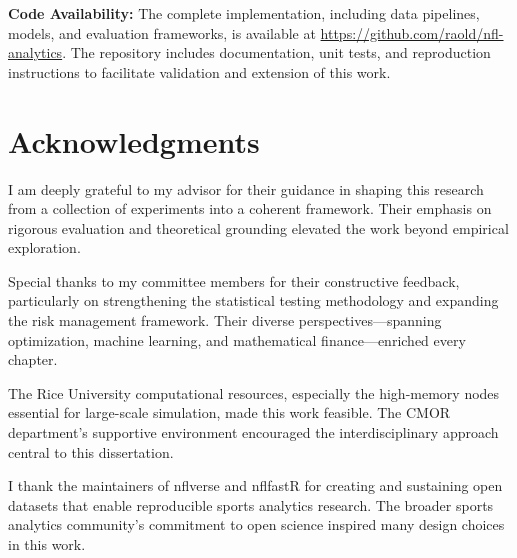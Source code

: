\documentclass[12pt,letterpaper]{report}
\theoremstyle{definition}
\begin{document}
\vspace{1em}
\noindent\textbf{Code Availability:} The complete implementation, including data pipelines, models, and evaluation frameworks, is available at \url{https://github.com/raold/nfl-analytics}. The repository includes documentation, unit tests, and reproduction instructions to facilitate validation and extension of this work.


\newpage
\chapter*{Acknowledgments}

I am deeply grateful to my advisor for their guidance in shaping this research from a collection of experiments into a coherent framework. Their emphasis on rigorous evaluation and theoretical grounding elevated the work beyond empirical exploration.

Special thanks to my committee members for their constructive feedback, particularly on strengthening the statistical testing methodology and expanding the risk management framework. Their diverse perspectives—spanning optimization, machine learning, and mathematical finance—enriched every chapter.

The Rice University computational resources, especially the high-memory nodes essential for large-scale simulation, made this work feasible. The CMOR department's supportive environment encouraged the interdisciplinary approach central to this dissertation.

I thank the maintainers of nflverse and nflfastR for creating and sustaining open datasets that enable reproducible sports analytics research. The broader sports analytics community's commitment to open science inspired many design choices in this work.
\end{document}
